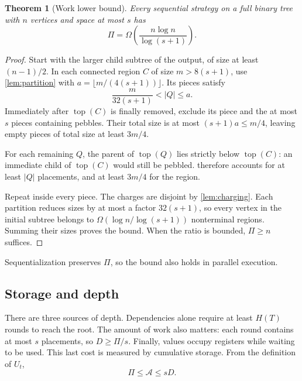 \documentclass[11pt]{article}
\newtheorem{theorem}{Theorem}[section]
\theoremstyle{definition}
\theoremstyle{remark}
\DeclareMathOperator{\topv}{top}
\newcommand{\Area}{\mathcal A}
\begin{document}
\begin{theorem}[Work lower bound]
\label{thm:universal-work}
Every sequential strategy on a full binary tree with $n$ vertices and space at most $s$ has
\begin{equation}
\Pi=\Omega\!\left(\frac{n\log n}{\log(s+1)}\right).
\label{eq:universal-work}
\end{equation}
\end{theorem}
\begin{proof}
Start with the larger child subtree of the output, of size at least $(n-1)/2$. In each connected region $C$ of size $m>8(s+1)$, use \cref{lem:partition} with $a=\lfloor m/(4(s+1))\rfloor$. Its pieces satisfy
\begin{equation}
 \frac{m}{32(s+1)}<|Q|\le a.
 \label{eq:work-partition}
\end{equation}
Immediately after $\topv(C)$ is finally removed, exclude its piece and the at most $s$ pieces containing pebbles. Their total size is at most $(s+1)a\le m/4$, leaving empty pieces of total size at least $3m/4$.

For each remaining $Q$, the parent of $\topv(Q)$ lies strictly below $\topv(C)$: an immediate child of $\topv(C)$ would still be pebbled.  therefore accounts for at least $|Q|$ placements, and at least $3m/4$ for the region.

Repeat inside every piece. The charges are disjoint by \cref{lem:charging}. Each partition reduces sizes by at most a factor $32(s+1)$, so every vertex in the initial subtree belongs to $\Omega(\log n/\log(s+1))$ nonterminal regions. Summing their sizes proves the bound. When the ratio is bounded, $\Pi\ge n$ suffices.
\end{proof}

Sequentialization preserves $\Pi$, so the bound also holds in parallel execution.

\subsection{Storage and depth}
\label{sec:area}

There are three sources of depth. Dependencies alone require at least $H(T)$ rounds to reach the root. The amount of work also matters: each round contains at most $s$ placements, so $D\ge\Pi/s$. Finally, values occupy registers while waiting to be used. This last cost is measured by cumulative storage. From the definition of $U_t$,
\begin{equation}
\Pi\le\Area\le sD.
\label{eq:capacity}
\end{equation}
\end{document}
